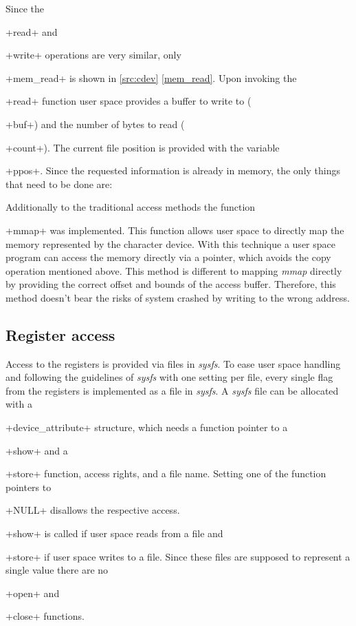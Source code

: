\documentclass[12pt,a4paper,parskip=full,abstract=true,BCOR=12mm,twoside,open=right]{scrreprt}
\newcommand*{\SavedLstInline}{}
\DeclareRobustCommand*{\lstinline}{%
  \ifmmode
    \let\SavedBGroup\bgroup
    \def\bgroup{%
      \let\bgroup\SavedBGroup
      \hbox\bgroup
    }%
  \fi
  \SavedLstInline
}
\def\device#1{\textit{#1}}
\begin{document}
Since the \lstinline+read+ and \lstinline+write+ operations are very similar,
only \lstinline+mem_read+ is shown in \cref{src:cdev} \cref{mem_read}. Upon invoking the
\lstinline+read+ function user space provides a buffer to write to (\lstinline+buf+)
and the number of bytes to read (\lstinline+count+). The current file
position is provided with the variable \lstinline+ppos+. Since the requested information
is already in memory, the only things that need to be done are:

Additionally to the traditional access methods the function \lstinline+mmap+
was implemented. This function allows user space to directly map the memory
represented by the character device. With this technique a user space program
can access the memory directly via a pointer, which avoids the copy operation
mentioned above. This method is different to mapping \mbox{\device{mmap}}
directly by providing the correct offset and bounds of the access buffer.
Therefore, this method doesn't bear the risks of system crashed by writing
to the wrong address.


\subsection{Register access}
\label{sec:register_access}

Access to the registers is provided via files in \device{sysfs}\cite{sysfs}. To ease
user space handling and following the guidelines of \device{sysfs} with one setting per file,
every single flag from the registers is implemented as a file in \device{sysfs}. A \device{sysfs} file
can be allocated with a \lstinline+device_attribute+ structure, which needs
a function pointer to a \lstinline+show+ and a \lstinline+store+ function, access rights,
and a file name. Setting one of the function pointers to \lstinline+NULL+ disallows the
respective access. \lstinline+show+ is called if user space reads from a file and
\lstinline+store+ if user space writes to a file. Since these files are supposed
to represent a single value there are no \lstinline+open+ and \lstinline+close+
functions.
\end{document}
